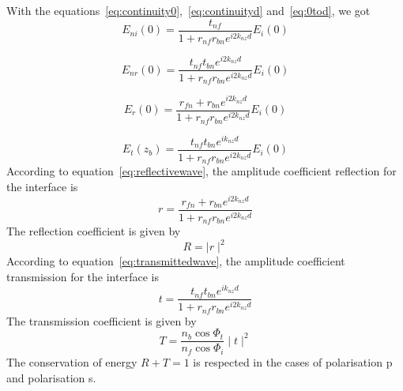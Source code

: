 With the equations~\eqref{eq:continuity0},~\eqref{eq:continuityd} and~\eqref{eq:0tod}, we got\\
\begin{equation}
E_{ni}(0)=\frac{t_{nf}}{1+r_{nf}r_{bn}e^{i2k_{nz}d}}E_i(0)
\end{equation}

\begin{equation}
E_{nr}(0)=\frac{t_{nf}t_{bn}e^{i2k_{nz}d}}{1+r_{nf}r_{bn}e^{i2k_{nz}d}}E_i(0)
\end{equation}

\begin{equation}\label{eq:reflectivewave}
E_{r}(0)=\frac{r_{fn}+r_{bn}e^{i2k_{nz}d}}{1+r_{nf}r_{bn}e^{i2k_{nz}d}}E_i(0)
\end{equation}

\begin{equation}\label{eq:transmittedwave}
E_{t}(z_b)=\frac{t_{nf}t_{bn}e^{ik_{nz}d}}{1+r_{nf}r_{bn}e^{i2k_{nz}d}}E_i(0)
\end{equation}
According to equation~\eqref{eq:reflectivewave}, the amplitude coefficient reflection for the interface is\\
$$
r=\frac{r_{fn}+r_{bn}e^{i2k_{nz}d}}{1+r_{nf}r_{bn}e^{i2k_{nz}d}}
$$
The reflection coefficient is given by
\begin{equation*}
R=\mid r\mid^2
\end{equation*}
According to equation~\eqref{eq:transmittedwave}, the amplitude coefficient transmission for the interface is\\
$$
t=\frac{t_{nf}t_{bn}e^{ik_{nz}d}}{1+r_{nf}r_{bn}e^{i2k_{nz}d}}
$$
The transmission coefficient is given by
\begin{equation*}
T=\frac{n_b\cos\Phi _t}{n_f\cos\Phi _i}\mid t\mid^2
\end{equation*}
The conservation of energy $R+T=1$ is respected in the cases of polarisation p and polarisation s.



